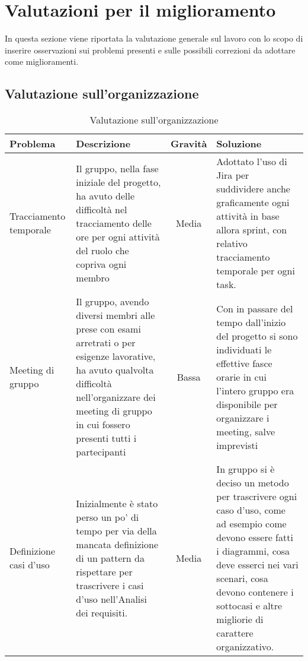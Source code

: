 \section{Valutazioni per il miglioramento}

In questa sezione viene riportata la valutazione generale sul lavoro con lo scopo di inserire osservazioni sui problemi presenti e sulle possibili correzioni da adottare come miglioramenti. 

\subsection{Valutazione sull’organizzazione}

\begin{table}[h]
\centering
\begin{tabular}{|p{3cm}|p{4cm}|c|p{5cm}|}
\hline
\rowcolor{gray!30}
\textbf{Problema} & \textbf{Descrizione} & \textbf{Gravità} & \textbf{Soluzione}\\
\hline
Tracciamento temporale & 
Il gruppo, nella fase iniziale del progetto, ha avuto delle difficoltà nel tracciamento delle ore per ogni attività del ruolo che copriva ogni membro & 
Media & 
Adottato l'uso di Jira per suddividere anche graficamente ogni attività in base allora sprint, con relativo tracciamento temporale per ogni task. \\
\hline
Meeting di gruppo &
Il gruppo, avendo diversi membri alle prese con esami arretrati o per esigenze lavorative, ha avuto qualvolta difficoltà nell'organizzare dei meeting di gruppo in cui fossero presenti tutti i partecipanti &
Bassa &
Con in passare del tempo dall'inizio del progetto si sono individuati le effettive fasce orarie in cui l'intero gruppo era disponibile per organizzare i meeting, salve imprevisti\\
\hline
Definizione casi d'uso &
Inizialmente è stato perso un po' di tempo per via della mancata definizione di un pattern da rispettare per trascrivere i casi d'uso nell'Analisi dei requisiti. &
Media &
In gruppo si è deciso un metodo per trascrivere ogni caso d'uso, come ad esempio come devono essere fatti i diagrammi, cosa deve esserci nei vari scenari, cosa devono contenere i sottocasi e altre migliorie di carattere organizzativo.
\\
\hline
\end{tabular}
\caption{Valutazione sull’organizzazione }
\end{table}
\newpage


